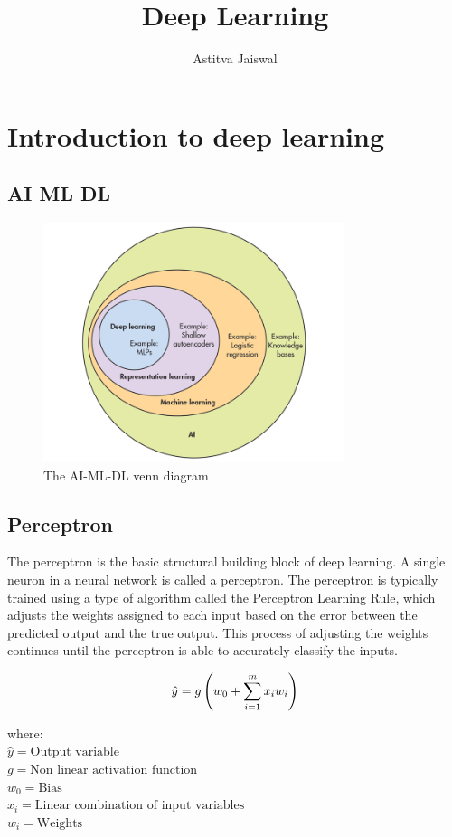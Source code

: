 \documentclass{report}
\title{\Huge{Deep Learning}}
\author{\huge{Astitva Jaiswal}}
\date{}
\begin{document}
\maketitle

\chapter{Introduction to deep learning}

\section{AI ML DL}

\begin{figure}[h]
	\includegraphics[width=250pt]{0}
	\centering
	\caption{The AI-ML-DL venn diagram}
\end{figure}

\section{Perceptron}

The perceptron is the basic structural building block of deep learning. A single neuron in a neural network is called a perceptron. The perceptron is typically trained using a type of algorithm called the Perceptron Learning Rule, which adjusts the weights assigned to each input based on the error between the predicted output and the true output. This process of adjusting the weights continues until the perceptron is able to accurately classify the inputs.

$$\hat{y}  = g \left(w_0 + \sum_{i = 1}^m x_i w_i  \right)$$

where: \\ $\hat{y} =  \textrm{Output variable}$ \\ $g = \textrm{Non linear activation function}$ \\ $w_0 =  \textrm{Bias}$ \\ $x_i = \textrm{Linear combination of input variables}$ \\ $w_i = \textrm{Weights}$
\end{document}
